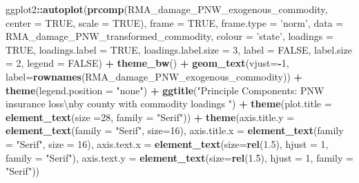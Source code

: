 \documentclass[]{article}
\newenvironment{Shaded}{\begin{snugshade}}{\end{snugshade}}
\newcommand{\CharTok}[1]{\textcolor[rgb]{0.31,0.60,0.02}{#1}}
\newcommand{\DataTypeTok}[1]{\textcolor[rgb]{0.13,0.29,0.53}{#1}}
\newcommand{\DecValTok}[1]{\textcolor[rgb]{0.00,0.00,0.81}{#1}}
\newcommand{\FloatTok}[1]{\textcolor[rgb]{0.00,0.00,0.81}{#1}}
\newcommand{\KeywordTok}[1]{\textcolor[rgb]{0.13,0.29,0.53}{\textbf{#1}}}
\newcommand{\NormalTok}[1]{#1}
\newcommand{\OperatorTok}[1]{\textcolor[rgb]{0.81,0.36,0.00}{\textbf{#1}}}
\newcommand{\OtherTok}[1]{\textcolor[rgb]{0.56,0.35,0.01}{#1}}
\newcommand{\StringTok}[1]{\textcolor[rgb]{0.31,0.60,0.02}{#1}}
\begin{document}
\begin{Shaded}
\begin{Highlighting}[]
\NormalTok{ggplot2}\OperatorTok{::}\KeywordTok{autoplot}\NormalTok{(}\KeywordTok{prcomp}\NormalTok{(RMA_damage_PNW_exogenous_commodity, }\DataTypeTok{center =} \OtherTok{TRUE}\NormalTok{, }\DataTypeTok{scale =} \OtherTok{TRUE}\NormalTok{), }\DataTypeTok{frame =} \OtherTok{TRUE}\NormalTok{, }\DataTypeTok{frame.type =} \StringTok{'norm'}\NormalTok{, }\DataTypeTok{data =}\NormalTok{ RMA_damage_PNW_transformed_commodity, }\DataTypeTok{colour =} \StringTok{'state'}\NormalTok{, }\DataTypeTok{loadings =} \OtherTok{TRUE}\NormalTok{, }\DataTypeTok{loadings.label =} \OtherTok{TRUE}\NormalTok{, }\DataTypeTok{loadings.label.size  =} \DecValTok{3}\NormalTok{, }\DataTypeTok{label =} \OtherTok{FALSE}\NormalTok{, }\DataTypeTok{label.size =} \DecValTok{2}\NormalTok{, }\DataTypeTok{legend =} \OtherTok{FALSE}\NormalTok{)  }\OperatorTok{+}\StringTok{ }\KeywordTok{theme_bw}\NormalTok{()   }\OperatorTok{+}\StringTok{ }\KeywordTok{geom_text}\NormalTok{(}\DataTypeTok{vjust=}\OperatorTok{-}\DecValTok{1}\NormalTok{, }\DataTypeTok{label=}\KeywordTok{rownames}\NormalTok{(RMA_damage_PNW_exogenous_commodity)) }\OperatorTok{+}\StringTok{ }\KeywordTok{theme}\NormalTok{(}\DataTypeTok{legend.position =} \StringTok{"none"}\NormalTok{) }\OperatorTok{+}\StringTok{ }\KeywordTok{ggtitle}\NormalTok{(}\StringTok{"Principle Components: PNW insurance loss}\CharTok{\textbackslash{}n}\StringTok{by county with commodity loadings "}\NormalTok{) }\OperatorTok{+}\StringTok{ }\KeywordTok{theme}\NormalTok{(}\DataTypeTok{plot.title =} \KeywordTok{element_text}\NormalTok{(}\DataTypeTok{size =}\DecValTok{28}\NormalTok{, }\DataTypeTok{family =} \StringTok{"Serif"}\NormalTok{)) }\OperatorTok{+}\StringTok{ }\KeywordTok{theme}\NormalTok{(}\DataTypeTok{axis.title.y =} \KeywordTok{element_text}\NormalTok{(}\DataTypeTok{family =} \StringTok{"Serif"}\NormalTok{, }\DataTypeTok{size=}\DecValTok{16}\NormalTok{), }\DataTypeTok{axis.title.x =} \KeywordTok{element_text}\NormalTok{(}\DataTypeTok{family =} \StringTok{"Serif"}\NormalTok{, }\DataTypeTok{size =} \DecValTok{16}\NormalTok{), }\DataTypeTok{axis.text.x =} \KeywordTok{element_text}\NormalTok{(}\DataTypeTok{size=}\KeywordTok{rel}\NormalTok{(}\FloatTok{1.5}\NormalTok{), }\DataTypeTok{hjust =} \DecValTok{1}\NormalTok{, }\DataTypeTok{family =} \StringTok{"Serif"}\NormalTok{), }\DataTypeTok{axis.text.y =} \KeywordTok{element_text}\NormalTok{(}\DataTypeTok{size=}\KeywordTok{rel}\NormalTok{(}\FloatTok{1.5}\NormalTok{), }\DataTypeTok{hjust =} \DecValTok{1}\NormalTok{, }\DataTypeTok{family =} \StringTok{"Serif"}\NormalTok{))}
\end{Highlighting}
\end{Shaded}
\end{document}
